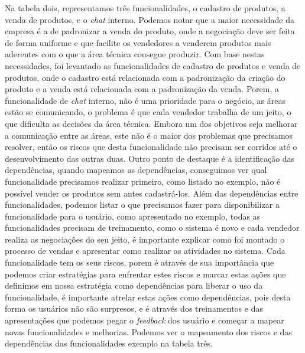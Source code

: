       Na tabela dois, representamos três funcionalidades, o cadastro de produtos,
      a venda de produtos, e o \textit{chat} interno. Podemos notar que a maior necessidade
      da empresa é a de padronizar a venda do produto, onde a negociação deve ser
      feita de forma uniforme e que facilite os vendedores a venderem produtos
      mais aderentes com o que a área técnica consegue produzir. Com base nestas
      necessidades, foi levantado as funcionalidades de cadastro de produtos e
      venda de produtos, onde o cadastro está relacionada com a padronização da
      criação do produto e a venda está relacionada com a padronização da venda.
      Porem, a funcionalidade de \textit{chat} interno, não é uma prioridade para
      o negócio, as áreas estão se comunicando, o problema é que cada vendedor
      trabalha de um jeito, o que dificulta as decisões da área técnica. Embora um
      dos objetivos seja melhorar a comunicação entre as áreas, este não é o maior
      dos problemas que precisamos resolver, então os riscos que desta funcionalidade
      não precisam ser corridos até o desenvolvimento das outras duas. \newline
      Outro ponto de destaque é a identificação das dependências, quando mapeamos
      as dependências, conseguimos ver qual funcionalidade precisamos realizar
      primeiro, como listado no exemplo, não é possível vender os produtos sem antes
      cadastrá-los. Além das dependências entre funcionalidades, podemos listar
      o que precisamos fazer para disponibilizar a funcionalidade para o usuário,
      como apresentado no exemplo, todas as funcionalidades precisam de treinamento,
      como o sistema é novo e cada vendedor realiza as negociações do seu jeito,
      é importante explicar como foi montado o processo de vendas e apresentar
      como realizar as atividades no sistema. \newline
      Cada funcionalidade tem os seus riscos, porem é através de sua importância que
      podemos criar estratégias para enfrentar estes riscos e marcar estas ações
      que definimos em nossa estratégia como dependências para liberar o uso da
      funcionalidade, é importante atrelar estas ações como dependências, pois desta
      forma os usuários não são surpresos, e é através dos treinamentos e das
      apresentações que podemos pegar o \textit{feedback} dos usuário e começar a
      mapear novas funcionalidades e melhorias. Podemos ver o mapeamento dos riscos
      e das dependências das funcionalidades exemplo na tabela três.\newline

